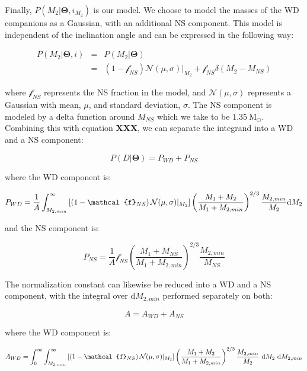 \documentclass[letterpaper,12pt,preprint]{aastex}
\newcommand{\Msun}{\mathrm{M}_\odot}
\begin{document}
Finally, $P(M_2|\mathbf{\Theta},i_{M_2})$ is our model. We choose to model the masses of the WD companions as a Gaussian, with an additional NS component. This model is independent of the inclination angle and can be expressed in the following way:

\begin{eqnarray}
P(M_2|\mathbf{\Theta},i) &=& P(M_2 | \mathbf{\Theta}) \\
  &=& \left( 1-\mathcal{f}_{NS} \right) \mathcal{N}(\mu , \sigma)|_{M_2} + \mathcal{f}_{NS} \delta \left( M_2 - M_{NS} \right)
\end{eqnarray}

where $\mathcal{f}_{NS}$ represents the NS fraction in the model, and $\mathcal{N}(\mu , \sigma)$ represents a Gaussian with mean, $\mu$, and standard deviation, $\sigma$. The NS component is modeled by a delta function around $M_{NS}$ which we take to be $1.35 ~\Msun$. Combining this with equation {\bf XXX}, we can separate the integrand into a WD and a NS component:

\begin{equation}
P(D|\mathbf{\Theta}) = P_{WD} + P_{NS}
\end{equation}

where the WD component is:

\begin{equation}
P_{WD} = \frac{1}{A} \int_{M_{2,min}}^{\infty} \left[ \left( 1-\mathcal{f}_{NS} \right) \mathcal{N}(\mu , \sigma)|_{M_2} \right]  \left( \frac{M_1 + M_2}{M_1 + M_{2,min}} \right)^{2/3} \frac{M_{2,min}}{M_2} {\rm d}M_2 
\end{equation}

and the NS component is:

\begin{equation}
P_{NS} = \frac{1}{A} \mathcal{f}_{NS}\left( \frac{M_1 + M_{NS}}{M_1 + M_{2,min}} \right)^{2/3} \frac{M_{2,min}}{M_{NS}}
\end{equation}

The normalization constant can likewise be reduced into a WD and a NS component, with the integral over d$M_{2,min}$ performed separately on both:

\begin{equation}
A = A_{WD} + A_{NS}
\end{equation}

where the WD component is:

\begin{equation}
A_{WD} = \int_0^{\infty} \int_{M_{2,min}}^{\infty} \left[ \left( 1-\mathcal{f}_{NS} \right) \mathcal{N}(\mu , \sigma)|_{M_2} \right]  \left( \frac{M_1 + M_2}{M_1 + M_{2,min}} \right)^{2/3} \frac{M_{2,min}}{M_2}\ {\rm d}M_2\ {\rm d}M_{2,min}
\end{equation}
\end{document}
